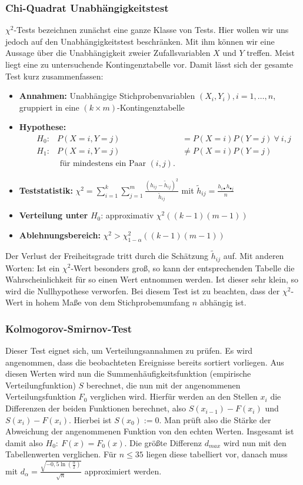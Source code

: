\subsubsection{Chi-Quadrat Unabhängigkeitstest}
\(\chi^{2}\)-Tests bezeichnen zunächst eine ganze Klasse von Tests. Hier wollen wir uns jedoch auf den Unabhängigkeitstest beschränken.
Mit ihm können wir eine Aussage über die Unabhängigkeit zweier Zufallsvariablen
 \(X\) und \(Y\) treffen. Meist liegt eine zu untersuchende Kontingenztabelle
vor. Damit lässt sich der gesamte Test kurz zusammenfassen:
\begin{itemize}
	\item \textbf{Annahmen:} Unabhängige  Stichprobenvariablen \((X_i,Y_i), i = 1,\dots , n\), gruppiert in eine \((k\times m)\)-Kontingenztabelle
	\item \textbf{Hypothese:} \begin{align*}
					&H_0: &P(X=i,Y=j) &= P(X=i) P(Y=j)\ \forall\ i,j\\
					&H_1: &P(X=i,Y=j) &\neq P(X=i) P(Y=j)\\
					& &\text{ für mindestens ein Paar } (i,j).&
				\end{align*}
	\item \textbf{Teststatistik:} \(\chi^2 =\sum\limits_{i=1}^{k}\sum\limits_{j=1}^{m}
					\frac{(h_{ij}-\tilde{h}_{ij})^2}{\tilde{h}_{ij}}\) mit \(\tilde{h}_{ij} = \frac{ h_{i\bullet} h_{\bullet j}}{ n } \)
	\item \textbf{Verteilung unter } \(H_0\): approximativ \(\chi^2((k-1)(m-1))\)
	\item \textbf{Ablehnungsbereich:} \(\chi^2 > \chi_{1-\alpha}^2((k-1)(m-1))\)
\end{itemize}
Der Verlust der Freiheitsgrade tritt durch die Schätzung \(\tilde{h}_{ij}\) auf.
Mit anderen Worten: Ist ein \(\chi^2\)-Wert besonders groß, so kann der
entsprechenden Tabelle die Wahrscheinlichkeit für so einen Wert entnommen werden. Ist dieser sehr
klein, so wird die Nullhypothese verworfen. Bei diesem Test ist zu beachten,
dass der \(\chi^2\)-Wert in hohem Maße von dem Stichprobemumfang \(n\) abhängig ist.

\subsubsection{Kolmogorov-Smirnov-Test}
Dieser Test eignet sich, um Verteilungsannahmen zu prüfen. Es wird angenommen, 
dass die beobachteten Ereignisse bereits sortiert vorliegen. Aus diesen Werten
wird nun die Summenhäufigkeitsfunktion (empirische Verteilungfunktion) \(S\) berechnet,
die nun mit der angenommenen Verteilungsfunktion \(F_0\) verglichen wird. Hierfür werden
an den Stellen \(x_i\) die Differenzen der beiden Funktionen berechnet, also
\(S(x_{i-1})-F(x_i)\) und \(S(x_i)-F(x_i)\). Hierbei ist \(S(x_0):=0\). Man prüft also
die Stärke der Abweichung der angenommenen Funktion von den echten Werten.
Insgesamt ist damit also \(H_0:\ F(x)=F_0(x).\)
Die größte Differenz \(d_{max}\) wird nun mit den Tabellenwerten verglichen. 
Für \(n \leq 35\) liegen diese tabelliert vor, danach muss mit 
\(d_\alpha =\frac{\sqrt{-0,5\ln(\frac{\alpha}{2})}}{\sqrt{n}}\) approximiert werden.

